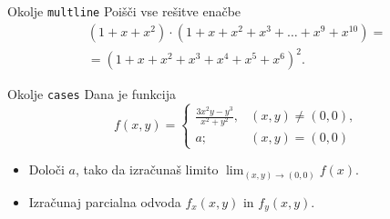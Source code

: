 \begin{frame}{Okolje \texttt{multline}}
	Poišči vse rešitve enačbe
	\begin{multline*}
		(1+x+x^2) \cdot (1+x+x^2+x^3+\ldots+x^9+x^{10}) = \\
		=(1+x+x^2+x^3+x^4+x^5+x^6)^2.	
	\end{multline*}

\end{frame}

\begin{frame}{Okolje \texttt{cases}}
	Dana je funkcija
	$$
		f(x, y) = \begin{cases}
				\frac{3x^2y-y^3}{x^2+y^2}, & (x, y) \ne (0, 0), \\
				a; & (x, y) = (0, 0)
		\end{cases}
	$$
	\begin{itemize}
	\item Določi $a$, tako da izračunaš limito \( \lim_{(x,y)\to(0,0)} f(x). \)
	\item Izračunaj parcialna odvoda $f_x(x,y)$ in $f_y(x,y)$.
	\end{itemize}
\end{frame}
